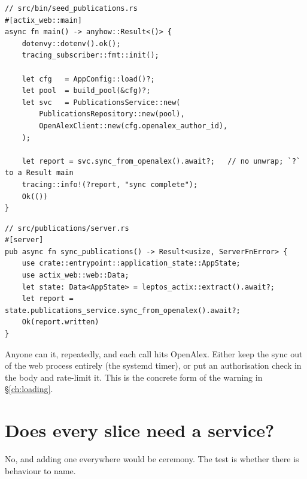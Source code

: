 \begin{lstlisting}[style=rs,caption={The binary becomes an adapter: compose, call, report, exit.}]
// src/bin/seed_publications.rs
#[actix_web::main]
async fn main() -> anyhow::Result<()> {
    dotenvy::dotenv().ok();
    tracing_subscriber::fmt::init();

    let cfg   = AppConfig::load()?;
    let pool  = build_pool(&cfg)?;
    let svc   = PublicationsService::new(
        PublicationsRepository::new(pool),
        OpenAlexClient::new(cfg.openalex_author_id),
    );

    let report = svc.sync_from_openalex().await?;   // no unwrap; `?` to a Result main
    tracing::info!(?report, "sync complete");
    Ok(())
}
\end{lstlisting}

\begin{lstlisting}[style=rs,caption={And the server function, for an admin ``refresh'' button.}]
// src/publications/server.rs
#[server]
pub async fn sync_publications() -> Result<usize, ServerFnError> {
    use crate::entrypoint::application_state::AppState;
    use actix_web::web::Data;
    let state: Data<AppState> = leptos_actix::extract().await?;
    let report = state.publications_service.sync_from_openalex().await?;
    Ok(report.written)
}
\end{lstlisting}

\begin{pitfall}
Anyone can  it, repeatedly, and each call hits OpenAlex. Either keep the sync
out of the web process entirely (the systemd timer), or put an authorisation check in the body and
rate-limit it. This is the concrete form of the warning in \S\ref{ch:loading}.
\end{pitfall}

\section{Does every slice need a service?}

No, and adding one everywhere would be ceremony. The test is whether there is behaviour to name.

